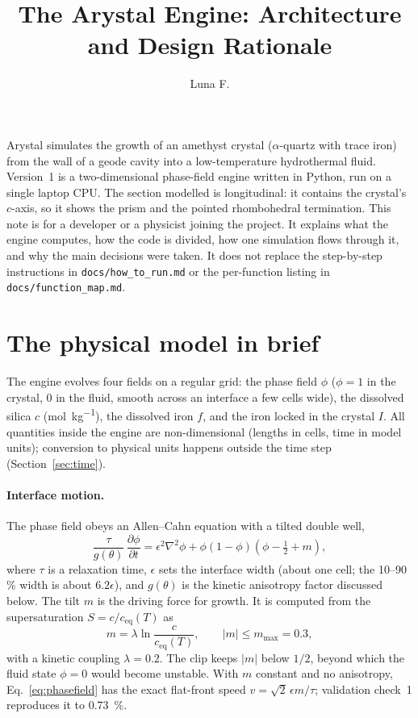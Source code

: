 \documentclass[11pt,a4paper]{article}
\title{The Arystal Engine: Architecture and Design Rationale}
\author{Luna F.}
\makeatletter
\newcommand{\code}[1]{\texttt{#1}}
\renewcommand{\maketitle}{%
  \begin{center}
    {\small\scshape \@context\par}\vspace{6pt}
    {\LARGE \@title\par}\vspace{6pt}
    {\normalsize \@author\par}
  \end{center}\vspace{10pt}}
\makeatother
\begin{document}
\maketitle

\noindent Arystal simulates the growth of an amethyst crystal ($\alpha$-quartz with trace iron) from the wall of a geode cavity into a low-temperature hydrothermal fluid. Version~1 is a two-dimensional phase-field engine written in Python, run on a single laptop CPU. The section modelled is longitudinal: it contains the crystal's $c$-axis, so it shows the prism and the pointed rhombohedral termination. This note is for a developer or a physicist joining the project. It explains what the engine computes, how the code is divided, how one simulation flows through it, and why the main decisions were taken. It does not replace the step-by-step instructions in \code{docs/how\_to\_run.md} or the per-function listing in \code{docs/function\_map.md}.

\tableofcontents

\section{The physical model in brief}\label{sec:model}

The engine evolves four fields on a regular grid: the phase field $\phi$ ($\phi=1$ in the crystal, $0$ in the fluid, smooth across an interface a few cells wide), the dissolved silica $c$ (\si{\mole\per\kilo\gram}), the dissolved iron $f$, and the iron locked in the crystal $I$. All quantities inside the engine are non-dimensional (lengths in cells, time in model units); conversion to physical units happens outside the time step (Section~\ref{sec:time}).

\paragraph{Interface motion.} The phase field obeys an Allen--Cahn equation with a tilted double well,
\begin{equation}\label{eq:phasefield}
  \frac{\tau}{g(\theta)}\,\frac{\partial\phi}{\partial t}
  = \epsilon^{2}\nabla^{2}\phi + \phi(1-\phi)\left(\phi-\tfrac12+m\right),
\end{equation}
where $\tau$ is a relaxation time, $\epsilon$ sets the interface width (about one cell; the 10--90\,\% width is about $6.2\epsilon$), and $g(\theta)$ is the kinetic anisotropy factor discussed below. The tilt $m$ is the driving force for growth. It is computed from the supersaturation $S=c/c_\mathrm{eq}(T)$ as
\begin{equation}\label{eq:driving}
  m = \lambda \ln\frac{c}{c_\mathrm{eq}(T)}, \qquad |m|\le m_\mathrm{max}=0.3 ,
\end{equation}
with a kinetic coupling $\lambda=0.2$. The clip keeps $|m|$ below $1/2$, beyond which the fluid state $\phi=0$ would become unstable. With $m$ constant and no anisotropy, Eq.~\eqref{eq:phasefield} has the exact flat-front speed $v=\sqrt2\,\epsilon m/\tau$; validation check~1 reproduces it to \SI{0.73}{\percent}.
\end{document}
